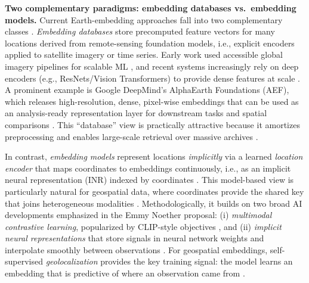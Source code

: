 \noindent\textbf{Two complementary paradigms: embedding databases vs.\ embedding models.}
Current Earth-embedding approaches fall into two complementary classes \citep{klemmer2025earth}. \emph{Embedding databases} store precomputed feature vectors for many locations derived from remote-sensing foundation models, i.e., explicit encoders applied to satellite imagery or time series. Early work used accessible global imagery pipelines for scalable ML \citep{rolf2021generalizable}, and recent systems increasingly rely on deep encoders (e.g., ResNets/Vision Transformers) to provide dense features at scale \citep{czerkawski2024majortom}. A prominent example is Google DeepMind’s AlphaEarth Foundations (AEF), which releases high-resolution, dense, pixel-wise embeddings that can be used as an analysis-ready representation layer for downstream tasks and spatial comparisons \citep{brown2025alphaearth}. This ``database'' view is practically attractive because it amortizes preprocessing and enables large-scale retrieval over massive archives \citep{klemmer2025earth}.

In contrast, \emph{embedding models} represent locations \emph{implicitly} via a learned \emph{location encoder} that maps coordinates to embeddings continuously, i.e., as an implicit neural representation (INR) indexed by coordinates \citep{mai2022review}. This model-based view is particularly natural for geospatial data, where coordinates provide the shared key that joins heterogeneous modalities \citep{klemmer2025earth}. Methodologically, it builds on two broad AI developments emphasized in the Emmy Noether proposal: (i) \emph{multimodal contrastive learning}, popularized by CLIP-style objectives \citep{radford2021clip}, and (ii) \emph{implicit neural representations} that store signals in neural network weights and interpolate smoothly between observations \citep{sitzmann2020siren,mildenhall2021nerf}. For geospatial embeddings, self-supervised \emph{geolocalization} provides the key training signal: the model learns an embedding that is predictive of where an observation came from \citep{klemmer2025earth}.

